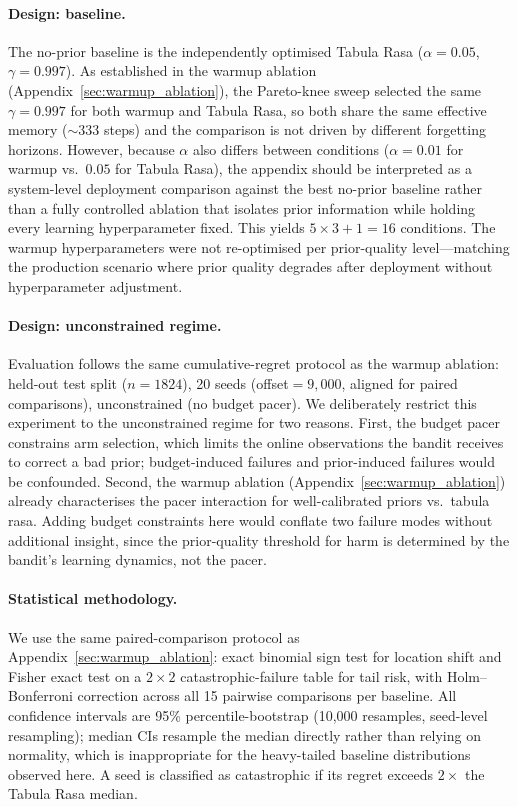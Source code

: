 \paragraph{Design: baseline.}
The no-prior baseline is the independently optimised Tabula Rasa
($\alpha{=}0.05$, $\gamma{=}0.997$).
As established in the warmup ablation
(Appendix~\ref{sec:warmup_ablation}), the Pareto-knee sweep selected
the same $\gamma{=}0.997$ for both warmup and Tabula Rasa, so
both share the same effective memory (${\sim}333$ steps)
and the comparison is not driven by different forgetting horizons.
However, because $\alpha$ also differs between conditions
($\alpha{=}0.01$ for warmup vs.\ $0.05$ for Tabula Rasa),
the appendix should be interpreted as a system-level deployment
comparison against the best no-prior baseline rather than a fully
controlled ablation that isolates prior information while holding
every learning hyperparameter fixed.
This yields $5 \times 3 + 1 = 16$ conditions.
The warmup hyperparameters were not re-optimised per
prior-quality level---matching the production scenario where prior
quality degrades after deployment without hyperparameter adjustment.

\paragraph{Design: unconstrained regime.}
Evaluation follows the same cumulative-regret protocol as the warmup
ablation: held-out test split ($n{=}1824$), 20 seeds
(offset${=}9{,}000$, aligned for paired comparisons), unconstrained
(no budget pacer).
We deliberately restrict this experiment to the unconstrained regime
for two reasons.
First, the budget pacer constrains arm selection, which limits the
online observations the bandit receives to correct a bad prior;
budget-induced failures and prior-induced failures would be
confounded.
Second, the warmup ablation (Appendix~\ref{sec:warmup_ablation})
already characterises the pacer interaction for well-calibrated
priors vs.\ tabula rasa.
Adding budget constraints here would conflate two failure modes
without additional insight, since the prior-quality threshold for
harm is determined by the bandit's learning dynamics, not the pacer.

\paragraph{Statistical methodology.}
We use the same paired-comparison protocol as
Appendix~\ref{sec:warmup_ablation}: exact binomial sign test for
location shift and Fisher exact test on a $2{\times}2$
catastrophic-failure table for tail risk, with Holm--Bonferroni
correction across all 15 pairwise comparisons per baseline.
All confidence intervals are 95\% percentile-bootstrap
(10{,}000 resamples, seed-level resampling);
median CIs resample the median directly rather than relying on
normality, which is inappropriate for the heavy-tailed baseline
distributions observed here.
A seed is classified as catastrophic if its regret exceeds
$2{\times}$ the Tabula Rasa median.

